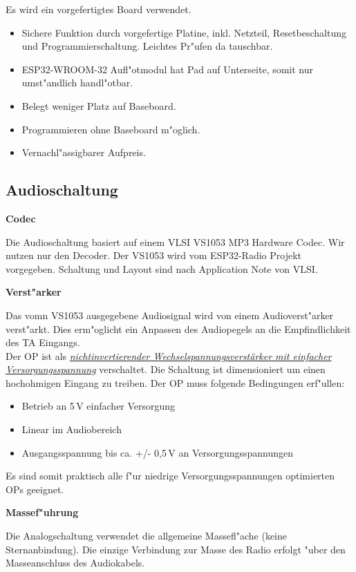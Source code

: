 \documentclass[ngerman,11pt,parskip=half] {scrartcl}
\begin{document}
Es wird ein vorgefertigtes Board verwendet.
\begin{itemize}
\item Sichere Funktion durch vorgefertige Platine, inkl. Netzteil, Resetbeschaltung und Programmierschaltung. Leichtes Pr"ufen da tauschbar.
\item ESP32-WROOM-32 Aufl"otmodul hat Pad auf Unterseite, somit nur umst"andlich handl"otbar.
\item Belegt weniger Platz auf Baseboard.
\item Programmieren ohne Baseboard m"oglich.
\item Vernachl"assigbarer Aufpreis.
\end{itemize}

\subsection{Audioschaltung} \label{sec:schaltung:audio}

\textbf{Codec}

Die Audioschaltung basiert auf einem VLSI VS1053 MP3 Hardware Codec. Wir nutzen nur den Decoder. Der VS1053 wird vom ESP32-Radio Projekt vorgegeben. Schaltung und Layout sind nach Application Note von VLSI.

\textbf{Verst"arker}

Das vomn VS1053 ausgegebene Audiosignal wird von einem Audioverst"arker verst"arkt. Dies erm"oglicht ein Anpassen des Audiopegels an die Empfindlichkeit des TA Eingangs. \\
Der OP ist als \emph{\href{https://www.mikrocontroller.net/articles/Operationsverst\%C3\%A4rker-Grundschaltungen\#Betrieb\_mit\_einfacher\_Versorgungsspannung}{nichtinvertierender Wechselspannungsverstärker mit einfacher Versorgungsspannung}} verschaltet. Die Schaltung ist dimensioniert um einen hochohmigen Eingang zu treiben. Der OP muss folgende Bedingungen erf"ullen:
\begin{itemize}
\item Betrieb an 5\,V einfacher Versorgung
\item Linear im Audiobereich
\item Ausgangsspannung bis ca. +/- 0,5\,V an Versorgungsspannungen
\end{itemize}
Es sind somit praktisch alle f"ur niedrige Versorgungsspannungen optimierten OPs geeignet.

\textbf{Massef"uhrung}

Die Analogschaltung verwendet die allgemeine Massefl"ache (keine Sternanbindung). Die einzige Verbindung zur Masse des Radio erfolgt "uber den Masseanschluss des Audiokabels.
\end{document}

